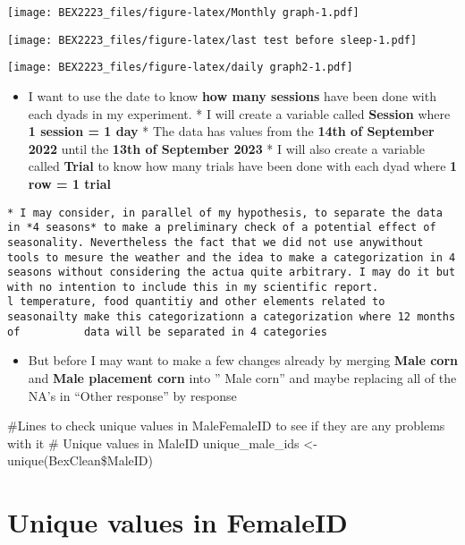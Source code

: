 \documentclass[
]{article}
\providecommand{\tightlist}{%
  \setlength{\itemsep}{0pt}\setlength{\parskip}{0pt}}
\begin{document}
\texttt{[image: BEX2223\_files/figure-latex/Monthly graph-1.pdf]}

\texttt{[image: BEX2223\_files/figure-latex/last test before sleep-1.pdf]}

\texttt{[image: BEX2223\_files/figure-latex/daily graph2-1.pdf]}

\begin{itemize}
\tightlist
\item
  I want to use the date to know \textbf{how many sessions} have been
  done with each dyads in my experiment. * I will create a variable
  called \textbf{Session} where \textbf{1 session = 1 day} * The data
  has values from the \textbf{14th of September 2022} until the
  \textbf{13th of September 2023} * I will also create a variable called
  \textbf{Trial} to know how many trials have been done with each dyad
  where \textbf{1 row = 1 trial}
\end{itemize}

\begin{verbatim}
* I may consider, in parallel of my hypothesis, to separate the data in *4 seasons* to make a preliminary check of a potential effect of seasonality. Nevertheless the fact that we did not use anywithout      tools to mesure the weather and the idea to make a categorization in 4 seasons without considering the actua quite arbitrary. I may do it but with no intention to include this in my scientific report.
l temperature, food quantitiy and other elements related to seasonailty make this categorizationn a categorization where 12 months of          data will be separated in 4 categories
\end{verbatim}

\begin{itemize}
\tightlist
\item
  But before I may want to make a few changes already by merging
  \textbf{Male corn} and \textbf{Male placement corn} into '' Male
  corn'' and maybe replacing all of the NA's in ``Other response'' by
  response
\end{itemize}

\#Lines to check unique values in MaleFemaleID to see if they are any
problems with it \# Unique values in MaleID unique\_male\_ids \textless-
unique(BexClean\$MaleID)

\hypertarget{unique-values-in-femaleid}{%
\section{Unique values in FemaleID}\label{unique-values-in-femaleid}}
\end{document}
